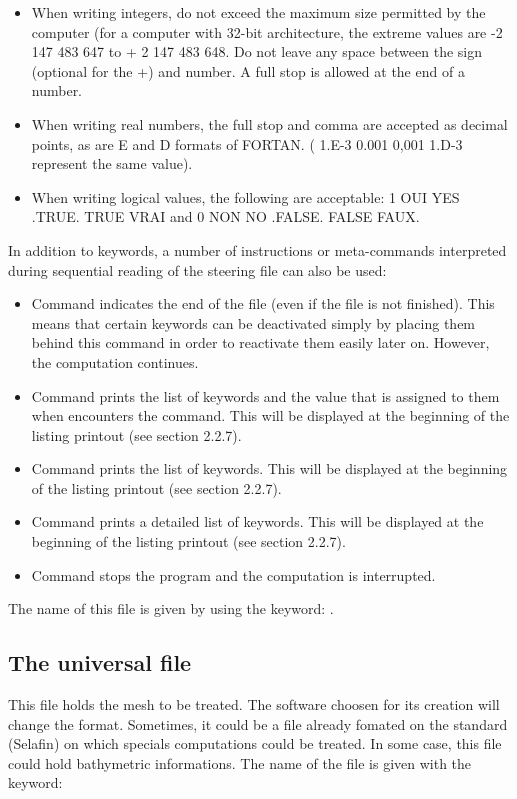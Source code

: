 \begin{itemize}
\begin{lstlisting}[language=TelemacCas]
\end{lstlisting}
\item When writing integers, do not exceed the maximum size permitted by the
computer (for a computer with 32-bit architecture, the extreme values are -2
147 483 647 to + 2 147 483 648. Do not leave any space between the sign
(optional for the +) and number. A full stop is allowed at the end of a number.
\item When writing real numbers, the full stop and comma are accepted as
decimal points, as are E and D formats of FORTAN. ( 1.E-3  0.001  0,001  1.D-3
represent the same value).
\item When writing logical values, the following are acceptable: 1 OUI  YES
.TRUE.  TRUE  VRAI and 0 NON  NO  .FALSE.  FALSE  FAUX.
\end{itemize}
In addition to keywords, a number of instructions or meta-commands interpreted
during sequential reading of the steering file can also be used:
\begin{itemize}
\item Command  indicates the end of the file (even if the file is not
finished). This means that certain keywords can be deactivated simply by
placing them behind this command in order to reactivate them easily later on.
However, the computation continues.
\item Command  prints the list of keywords and the value that is assigned
to them when \damo encounters the command. This will be displayed at the
beginning of the listing printout (see section 2.2.7).
\item Command  prints the list of keywords. This will be displayed at the
beginning of the listing printout (see section 2.2.7).
\item Command  prints a detailed list of keywords. This will be displayed
at the beginning of the listing printout (see section 2.2.7).
\item Command  stops the program and the computation is interrupted.
\end{itemize}
The name of this file is given by using the keyword: .

\subsection{The universal file}
This file holds the mesh to be treated. The software choosen for its creation
will change the format. Sometimes, it could be a file already fomated on the
\telemacsystem standard (Selafin) on which specials computations could be
treated.
In some case, this file could hold bathymetric informations.
The name of the file is given with the keyword: 

